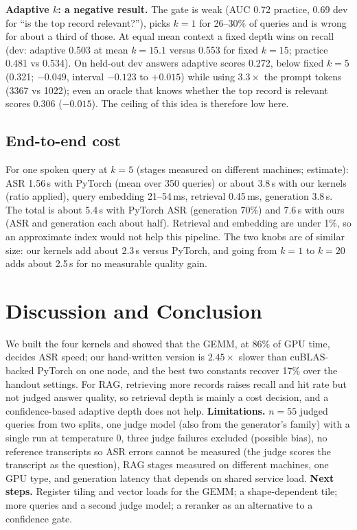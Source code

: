\documentclass{article}
\begin{document}
\textbf{Adaptive $k$: a negative result.} The gate is weak (AUC 0.72 practice, 0.69 dev for ``is the top record relevant?''), picks $k{=}1$ for 26--30\% of queries and is wrong for about a third of those. At equal mean context a fixed depth wins on recall (dev: adaptive 0.503 at mean $k{=}15.1$ versus 0.553 for fixed $k{=}15$; practice 0.481 vs 0.534). On held-out dev answers adaptive scores 0.272, below fixed $k{=}5$ (0.321; $-0.049$, interval $-0.123$ to $+0.015$) while using $3.3\times$ the prompt tokens (3367 vs 1022); even an oracle that knows whether the top record is relevant scores 0.306 ($-0.015$). The ceiling of this idea is therefore low here.

\subsection{End-to-end cost}
For one spoken query at $k{=}5$ (stages measured on different machines; estimate): ASR 1.56\,s with PyTorch (mean over 350 queries) or about 3.8\,s with our kernels (ratio applied), query embedding 21--54\,ms, retrieval 0.45\,ms, generation 3.8\,s. The total is about 5.4\,s with PyTorch ASR (generation 70\%) and 7.6\,s with ours (ASR and generation each about half). Retrieval and embedding are under 1\%, so an approximate index would not help this pipeline. The two knobs are of similar size: our kernels add about 2.3\,s versus PyTorch, and going from $k{=}1$ to $k{=}20$ adds about 2.5\,s for no measurable quality gain.

\section{Discussion and Conclusion}
\label{sec:conclusion}
We built the four kernels and showed that the GEMM, at 86\% of GPU time, decides ASR speed; our hand-written version is $2.45\times$ slower than cuBLAS-backed PyTorch on one node, and the best two constants recover 17\% over the handout settings. For RAG, retrieving more records raises recall and hit rate but not judged answer quality, so retrieval depth is mainly a cost decision, and a confidence-based adaptive depth does not help. \textbf{Limitations.} $n{=}55$ judged queries from two splits, one judge model (also from the generator's family) with a single run at temperature 0, three judge failures excluded (possible bias), no reference transcripts so ASR errors cannot be measured (the judge scores the transcript as the question), RAG stages measured on different machines, one GPU type, and generation latency that depends on shared service load. \textbf{Next steps.} Register tiling and vector loads for the GEMM; a shape-dependent tile; more queries and a second judge model; a reranker as an alternative to a confidence gate.
\end{document}
